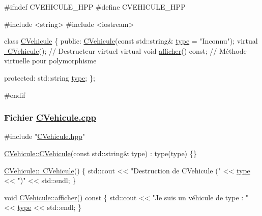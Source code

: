\begin{DoxyCode}
\textcolor{preprocessor}{#ifndef CVEHICULE\_HPP}
\textcolor{preprocessor}{#define CVEHICULE\_HPP}

\textcolor{preprocessor}{#include <string>}
\textcolor{preprocessor}{#include <iostream>}

\textcolor{keyword}{class }\hyperlink{classCVehicule}{CVehicule} \{
\textcolor{keyword}{public}:
    \hyperlink{classCVehicule_a05c0b5b9a9a96f5c6f9973e85e713d7a}{CVehicule}(\textcolor{keyword}{const} std::string& \hyperlink{classCVehicule_aade35613ce26b4263d09d39889604022}{type} = \textcolor{stringliteral}{"Inconnu"});
    \textcolor{keyword}{virtual} \hyperlink{classCVehicule_a149e48f61193e22310c87a418f11fcc3}{~CVehicule}(); \textcolor{comment}{// Destructeur virtuel}
    \textcolor{keyword}{virtual} \textcolor{keywordtype}{void} \hyperlink{classCVehicule_a7d62fa555949feb096b4f56781164895}{afficher}() \textcolor{keyword}{const}; \textcolor{comment}{// Méthode virtuelle pour polymorphisme}

\textcolor{keyword}{protected}:
    std::string \hyperlink{classCVehicule_aade35613ce26b4263d09d39889604022}{type};
\};

\textcolor{preprocessor}{#endif}
\end{DoxyCode}


\subsubsection*{Fichier {\ttfamily \hyperlink{CVehicule_8cpp}{C\+Vehicule.\+cpp}}}


\begin{DoxyCode}
\textcolor{preprocessor}{#include "\hyperlink{CVehicule_8hpp}{CVehicule.hpp}"}

\hyperlink{classCVehicule_a05c0b5b9a9a96f5c6f9973e85e713d7a}{CVehicule::CVehicule}(\textcolor{keyword}{const} std::string& type) : type(type) \{\}

\hyperlink{classCVehicule_a149e48f61193e22310c87a418f11fcc3}{CVehicule::~CVehicule}() \{
    std::cout << \textcolor{stringliteral}{"Destruction de CVehicule ("} << \hyperlink{classCVehicule_aade35613ce26b4263d09d39889604022}{type} << \textcolor{stringliteral}{")"} << std::endl;
\}

\textcolor{keywordtype}{void} \hyperlink{classCVehicule_a7d62fa555949feb096b4f56781164895}{CVehicule::afficher}()\textcolor{keyword}{ const }\{
    std::cout << \textcolor{stringliteral}{"Je suis un véhicule de type : "} << \hyperlink{classCVehicule_aade35613ce26b4263d09d39889604022}{type} << std::endl;
\}
\end{DoxyCode}



